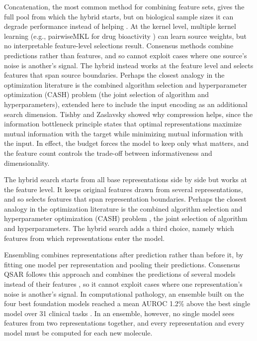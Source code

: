 Concatenation, the most common method for combining feature sets, gives the full pool from which the hybrid starts, but on biological sample sizes it can degrade performance instead of helping \citep{Bellman1961, Stahlschmidt2022}. At the kernel level, multiple kernel learning \citep{Gonen2011} (e.g., pairwiseMKL for drug bioactivity \citep{Cichonska2018}) can learn source weights, but no interpretable feature-level selections result. Consensus methods \citep{Valsecchi2020} combine predictions rather than features, and so cannot exploit cases where one source's noise is another's signal. The hybrid instead works at the feature level and selects features that span source boundaries. Perhaps the closest analogy in the optimization literature is the combined algorithm selection and hyperparameter optimization (CASH) problem \citep{Thornton2013} (the joint selection of algorithm and hyperparameters), extended here to include the input encoding as an additional search dimension. Tishby and Zaslavsky \citep{Tishby2015} showed why compression helps, since the information bottleneck principle states that optimal representations maximize mutual information with the target while minimizing mutual information with the input. In effect, the budget forces the model to keep only what matters, and the feature count controls the trade-off between informativeness and dimensionality.

The hybrid search starts from all base representations side by side but works at the feature level. It keeps original features drawn from several representations, and so selects features that span representation boundaries. Perhaps the closest analogy in the optimization literature is the combined algorithm selection and hyperparameter optimization (CASH) problem \citep{Thornton2013}, the joint selection of algorithm and hyperparameters. The hybrid search adds a third choice, namely which features from which representations enter the model.




Ensembling combines representations after prediction rather than before it, by fitting one model per representation and pooling their predictions. Consensus QSAR follows this approach and combines the predictions of several models instead of their features \citep{Valsecchi2020}, so it cannot exploit cases where one representation's noise is another's signal. In computational pathology, an ensemble built on the four best foundation models reached a mean AUROC 1.2\% above the best single model over 31 clinical tasks \citep{ElNahhas2025}. In an ensemble, however, no single model sees features from two representations together, and every representation and every model must be computed for each new molecule.

